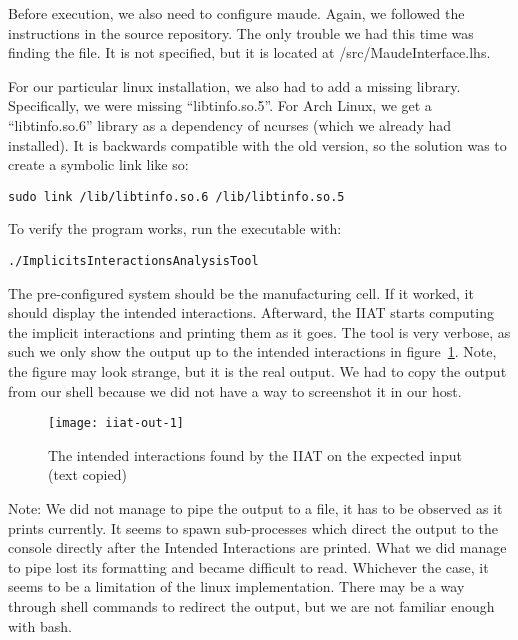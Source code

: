 Before execution, we also need to configure maude.
Again, we followed the instructions in the source repository.
The only trouble we had this time was finding the file.
It is not specified, but it is located at /src/MaudeInterface.lhs.

For our particular linux installation, we also had to add a missing library.
Specifically, we were missing ``libtinfo.so.5''.
For Arch Linux, we get a ``libtinfo.so.6'' library as a dependency of ncurses (which we already had installed).
It is backwards compatible with the old version, so the solution was to create a symbolic link like so:
\begin{verbatim}sudo link /lib/libtinfo.so.6 /lib/libtinfo.so.5\end{verbatim}

To verify the program works, run the executable with:
\begin{verbatim}./ImplicitsInteractionsAnalysisTool\end{verbatim}
The pre-configured system should be the manufacturing cell.
If it worked, it should display the intended interactions.
Afterward, the IIAT starts computing the implicit interactions and printing them as it goes.
The tool is very verbose, as such we only show the output up to the intended interactions in figure~\ref{fig:iiat-out}.
Note, the figure may look strange, but it is the real output.
We had to copy the output from our shell because we did not have a way to screenshot it in our host.
\begin{figure}[h]
    \centering
    \texttt{[image: iiat-out-1]}
    \caption{The intended interactions found by the IIAT on the expected input (text copied)}
    \label{fig:iiat-out}
\end{figure}

Note: We did not manage to pipe the output to a file, it has to be observed as it prints currently.
It seems to spawn sub-processes which direct the output to the console directly after the Intended Interactions are printed.
What we did manage to pipe lost its formatting and became difficult to read.
Whichever the case, it seems to be a limitation of the linux implementation.
There may be a way through shell commands to redirect the output, but we are not familiar enough with bash.

